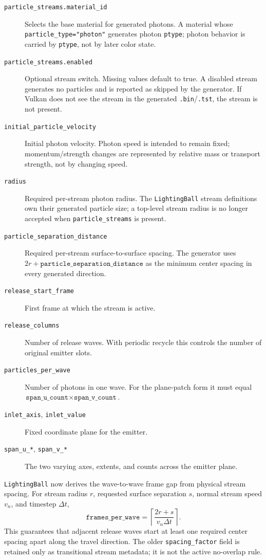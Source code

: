 \begin{description}
    \item[\texttt{particle\_streams.material\_id}] Selects the base material
    for generated photons.  A material whose
    \texttt{particle\_type="photon"} generates photon \texttt{ptype}; photon
    behavior is carried by \texttt{ptype}, not by later color state.
    \item[\texttt{particle\_streams.enabled}] Optional stream switch.  Missing
    values default to true.  A disabled stream generates no particles and is
    reported as skipped by the generator.  If Vulkan does not see the stream
    in the generated \texttt{.bin}/\texttt{.tst}, the stream is not present.
    \item[\texttt{initial\_particle\_velocity}] Initial photon velocity.
    Photon speed is intended to remain fixed; momentum/strength changes are
    represented by relative mass or transport strength, not by changing speed.
    \item[\texttt{radius}] Required per-stream photon radius.  The
    \texttt{LightingBall} stream definitions own their generated particle
    size; a top-level stream radius is no longer accepted when
    \texttt{particle\_streams} is present.
    \item[\texttt{particle\_separation\_distance}] Required per-stream
    surface-to-surface spacing.  The generator uses
    \(2r+\texttt{particle\_separation\_distance}\) as the minimum center
    spacing in every generated direction.
    \item[\texttt{release\_start\_frame}] First frame at which the stream is
    active.
    \item[\texttt{release\_columns}] Number of release waves.  With periodic
    recycle this controls the number of original emitter slots.
    \item[\texttt{particles\_per\_wave}] Number of photons in one wave.  For
    the plane-patch form it must equal
    \(\texttt{span\_u\_count}\times\texttt{span\_v\_count}\).
    \item[\texttt{inlet\_axis}, \texttt{inlet\_value}] Fixed coordinate plane
    for the emitter.
    \item[\texttt{span\_u\_*}, \texttt{span\_v\_*}] The two varying axes,
    extents, and counts across the emitter plane.
\end{description}

\texttt{LightingBall} now derives the wave-to-wave frame gap from physical
stream spacing.  For stream radius \(r\), requested surface separation \(s\),
normal stream speed \(v_n\), and timestep \(\Delta t\),
\[
    \texttt{frames\_per\_wave}
    =
    \left\lceil
      \frac{2r+s}{v_n\Delta t}
    \right\rceil .
\]
This guarantees that adjacent release waves start at least one required
center spacing apart along the travel direction.  The older
\texttt{spacing\_factor} field is retained only as transitional stream
metadata; it is not the active no-overlap rule.

